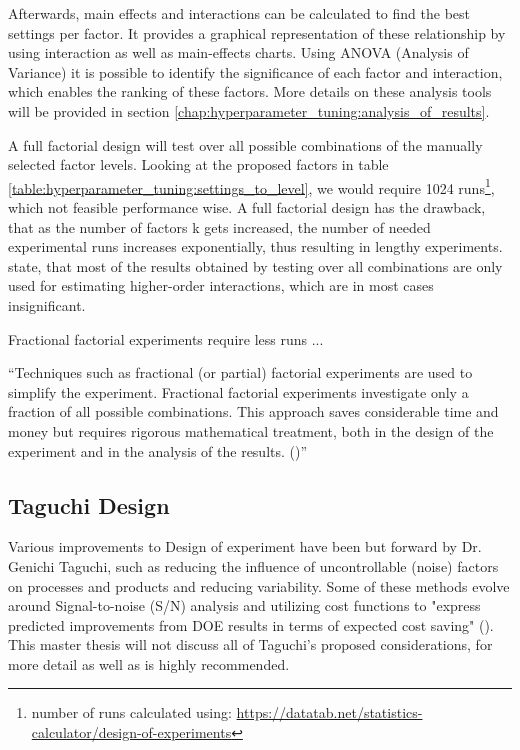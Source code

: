 Afterwards, main effects and interactions can be calculated to find the best settings per factor. It provides a graphical representation of these relationship by using interaction as well as main-effects charts.
Using ANOVA (Analysis of Variance) it is possible to identify the significance of each factor and interaction, which enables the ranking of these factors. More details on these analysis tools will be provided in section \ref{chap:hyperparameter_tuning:analysis_of_results}.

A full factorial design will test over all possible combinations of the manually selected factor levels. Looking at the proposed factors in table \ref{table:hyperparameter_tuning:settings_to_level}, we would require 1024 runs\footnote{number of runs calculated using: \url{https://datatab.net/statistics-calculator/design-of-experiments}}, which not feasible performance wise. A full factorial design has the drawback, that as the number of factors k gets increased, the number of needed experimental runs increases exponentially, thus resulting in lengthy experiments. \cite{yang_design_2009} state, that most of the results obtained by testing over all combinations are only used for estimating higher-order interactions, which are in most cases insignificant.

Fractional factorial experiments require less runs ... 

\enquote{Techniques such as fractional (or partial) factorial experiments are used to simplify the experiment. Fractional factorial experiments investigate only a fraction of all possible combinations. This approach saves considerable time and money but requires rigorous mathematical treatment, both in the design of the experiment and in the analysis of the results. (\cite{roy_primer_1990})}


\subsection{Taguchi Design}
Various improvements to Design of experiment have been but forward by Dr. Genichi Taguchi, such as reducing the influence of uncontrollable (noise) factors on processes and products and reducing variability. Some of these methods evolve around Signal-to-noise (S/N) analysis and utilizing cost functions to "express predicted improvements from DOE results in terms of expected cost saving" (\cite{roy_primer_1990}). This master thesis will not discuss all of Taguchi's proposed considerations, for more detail \cite{roy_primer_1990} as well as \cite{yang_design_2009} is highly recommended.

